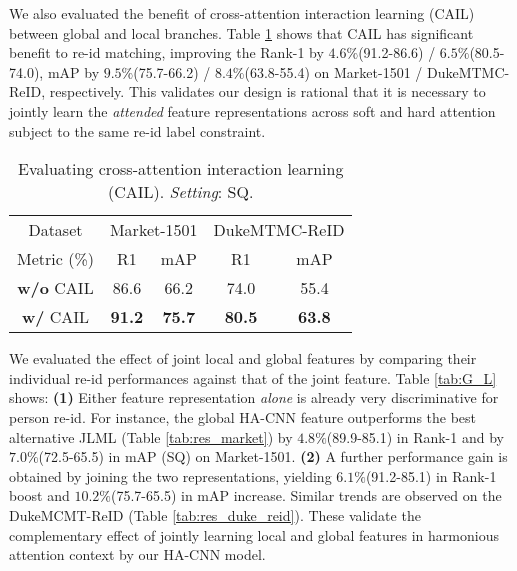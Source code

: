 \documentclass[10pt,twocolumn,letterpaper]{article}
\begin{document}
\vspace{0.02cm}
We also evaluated the benefit of cross-attention interaction learning (CAIL) between global and local branches. 
Table \ref{tab:res_hi} shows that CAIL has significant benefit to re-id matching,
improving the Rank-1 by $4.6\%$(91.2-86.6) / $6.5\%$(80.5-74.0),
mAP by $9.5\%$(75.7-66.2) / $8.4\%$(63.8-55.4) on Market-1501 / DukeMTMC-ReID, respectively.
This validates our design is rational that it is necessary to jointly learn
the {\em attended} feature representations across soft and hard attention
subject to the same re-id label constraint.
\vspace{-0.1cm}
\begin{table} [!t]
	\centering
\renewcommand{\arraystretch}{1.2}
	\setlength{\tabcolsep}{0.2 cm}
\caption{Evaluating cross-attention interaction learning (CAIL). {\em Setting}: SQ.
	}
	\vskip 1pt \begin{tabular}{|c|cc|cc|}
		\hline
		Dataset &  \multicolumn{2}{c|}{Market-1501} &
		\multicolumn{2}{c|}{DukeMTMC-ReID} \\ \cline{1-5}
		Metric (\%)    & R1 & mAP & R1 & mAP  \\ \hline \hline
{\bf w/o} CAIL &  86.6 &  66.2  &  74.0 &  55.4\\  
		\hline
		{\bf w/} CAIL & \bf 91.2 & \bf 75.7  & \bf 80.5 & \bf 63.8\\ 
		\hline
	\end{tabular}\label{tab:res_hi}
	\vspace{-0.4cm}
\end{table}


\vspace{0.01cm}
We evaluated the effect of joint local and global features by
comparing their individual re-id performances against that of the joint feature.
Table \ref{tab:G_L} shows: 
{\bf (1)} Either feature representation {\em alone} is already very
discriminative for person re-id. For instance, the global HA-CNN feature 
outperforms the best alternative JLML \cite{li2017person}
(Table \ref{tab:res_market}) by $4.8\%$(89.9-85.1) in Rank-1 
and by $7.0\%$(72.5-65.5) in mAP (SQ) on Market-1501.
{\bf (2)} A further performance gain is obtained by joining the two
representations, yielding $6.1\%$(91.2-85.1) in Rank-1 boost and $10.2\%$(75.7-65.5) in mAP increase.
Similar trends are observed on the DukeMCMT-ReID (Table \ref{tab:res_duke_reid}).
These validate the complementary effect of jointly learning
local and global features in harmonious attention context 
by our HA-CNN model. 
\end{document}
